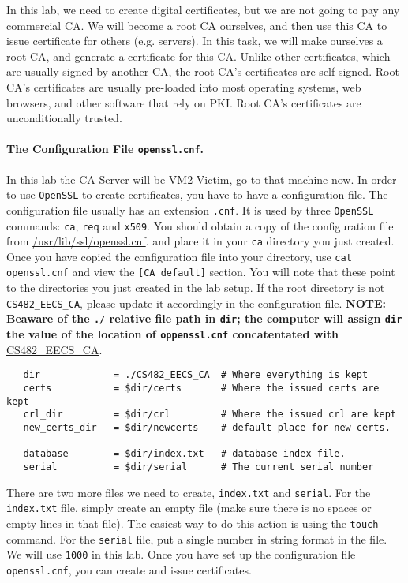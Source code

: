 \documentclass{article}
\begin{document}
In this lab, we need to create digital certificates, but we are not going to pay
any commercial CA. We will become a root CA ourselves, and then use this CA to 
issue certificate for others (e.g. servers). In this task, we will make
ourselves a root CA, and generate a certificate for this CA. Unlike 
other certificates, which are usually signed by another CA, the root CA's 
certificates are self-signed. Root CA's certificates are usually pre-loaded
into most operating systems, web browsers, and other software that rely on PKI.
Root CA's certificates are unconditionally trusted.


\paragraph{The Configuration File {\tt openssl.cnf}.} In this lab the CA Server will be VM2 Victim, go to that machine now. In order to use {\tt OpenSSL} to create certificates, you have to have a configuration file.
The configuration file usually has an extension
{\tt .cnf}. It is used by three {\tt OpenSSL} commands: {\tt ca}, {\tt req} and {\tt x509}. 
You should obtain a  copy of the configuration file from \url{/usr/lib/ssl/openssl.cnf}. 
and place it in your {\tt ca} directory you just created. Once you have copied the configuration file into your directory, use {\tt cat openssl.cnf} and view the {\tt [CA\_default]} section. You will note that these point to the directories you just created in the lab setup. If the root directory is not {\tt CS482\_EECS\_CA}, please update it accordingly in the configuration file. \textbf{NOTE: Beaware of the {\tt ./} relative file path in {\tt dir}; the computer will assign {\tt dir} the value of the location of {\tt oppenssl.cnf} concatentated with} \url{CS482_EECS_CA}. 

\begin{verbatim}
   dir             = ./CS482_EECS_CA  # Where everything is kept
   certs           = $dir/certs       # Where the issued certs are kept
   crl_dir         = $dir/crl         # Where the issued crl are kept
   new_certs_dir   = $dir/newcerts    # default place for new certs.

   database        = $dir/index.txt   # database index file.
   serial          = $dir/serial      # The current serial number
\end{verbatim} 

There are two more files we need to create, {\tt index.txt} and  {\tt serial}. 
For the {\tt index.txt} file, simply create an empty file (make sure there is no spaces or empty lines in that file). The easiest way to do this action is using the {\tt touch} command. For 
the {\tt serial} file, put a single number in string format in the file. We will use {\tt 1000} in this lab.
Once you have set up the configuration file {\tt openssl.cnf}, 
you can create and issue certificates.
\end{document}
